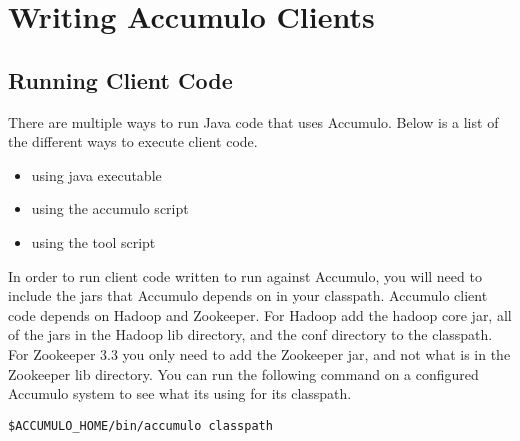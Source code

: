 
%
%

\chapter{Writing Accumulo Clients}

\section{Running Client Code}

There are multiple ways to run Java code that uses Accumulo. Below is a list
of the different ways to execute client code.

\begin{itemize} 
  \item using java executable 
  \item using the accumulo script
  \item using the tool script 
\end{itemize}

In order to run client code written to run against Accumulo, you will need to
include the jars that Accumulo depends on in your classpath. Accumulo client
code depends on Hadoop and Zookeeper. For Hadoop add the hadoop core jar, all
of the jars in the Hadoop lib directory, and the conf directory to the
classpath. For Zookeeper 3.3 you only need to add the Zookeeper jar, and not
what is in the Zookeeper lib directory. You can run the following command on a
configured Accumulo system to see what its using for its classpath.

\small 
\begin{verbatim} 
$ACCUMULO_HOME/bin/accumulo classpath 
\end{verbatim}
\normalsize

